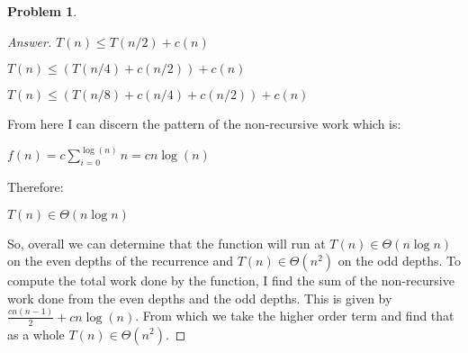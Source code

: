 \documentclass[11pt]{article}
\theoremstyle{definition}
\theoremstyle{definition}
\newtheorem{required}{Problem}
\theoremstyle{definition}
\begin{document}
\begin{required}
\begin{enumerate}[label=(\alph*)]
\begin{proof}[Answer]
$T(n)\leq T(n/2)+c(n)$

$T(n)\leq (T(n/4) + c(n/2)) + c(n)$

$T(n)\leq (T(n/8) + c(n/4)+c(n/2)) + c(n)$

From here I can discern the pattern of the non-recursive work which is:

$f(n)=c\sum_{i=0}^{\log(n)}n=cn\log(n)$

Therefore:



$T(n)\in \Theta(n\log n)$


So, overall we can determine that the function will run at $T(n)\in \Theta(n\log n)$ on the even depths of the recurrence and $T(n)\in \Theta(n^2)$ on the odd depths. To compute the total work done by the function, I find the sum of the non-recursive work done from the even depths and the odd depths. This is given by $\frac{cn(n-1)}{2}+ cn\log(n)$. From which we take the higher order term and find that as a whole $T(n) \in \Theta(n^2)$.


\end{proof}

\end{enumerate}
\end{required}
\end{document}
